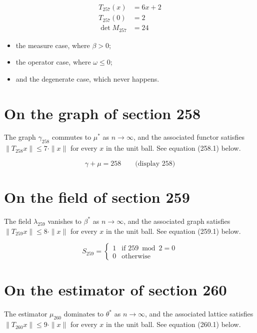 \documentclass{article}
\begin{document}
\begin{align}
T_{257}(x) &= 6 x + 2 \\
T_{257}(0) &= 2 \\
\det M_{257} &= 24
\end{align}

\begin{itemize}
  \item the measure case, where $\beta > 0$;
  \item the operator case, where $\omega \leq 0$;
  \item and the degenerate case, which never happens.
\end{itemize}

\section{On the graph of section 258}
The graph $\gamma_{258}$ commutes to $\mu^{*}$ as $n \to \infty$,
and the associated functor satisfies $\|T_{258} x\| \leq 7 \cdot \|x\|$
for every $x$ in the unit ball. See equation (258.1) below.

$$
\gamma + \mu = 258 \qquad \text{(display 258)}
$$

\section{On the field of section 259}
The field $\lambda_{259}$ vanishes to $\beta^{*}$ as $n \to \infty$,
and the associated graph satisfies $\|T_{259} x\| \leq 8 \cdot \|x\|$
for every $x$ in the unit ball. See equation (259.1) below.

\begin{equation}
S_{259} = \begin{cases} 1 & \text{if } 259 \bmod 2 = 0 \\ 0 & \text{otherwise} \end{cases}
\end{equation}

\section{On the estimator of section 260}
The estimator $\mu_{260}$ dominates to $\theta^{*}$ as $n \to \infty$,
and the associated lattice satisfies $\|T_{260} x\| \leq 9 \cdot \|x\|$
for every $x$ in the unit ball. See equation (260.1) below.
\end{document}
